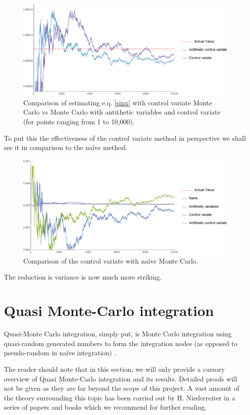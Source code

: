 \documentclass[12pt]{article}
\numberwithin{equation}{section}
\begin{document}
\begin{figure}[!htb]
    \centering
    \includegraphics[width=\textwidth]{Images/controlvariate.png}
    \caption{Comparison of estimating e.q. \ref{sinx} with control variate Monte Carlo vs Monte Carlo with antithetic variables and control variate (for points ranging from 1 to 10,000).}
    \label{fig:controlvariate}
\end{figure}
\FloatBarrier
\par To put this the effectiveness of the control variate method in perspective we shall see it in comparison to the naïve method.

\begin{figure}[!htb]
    \centering
    \includegraphics[width=\textwidth]{Images/controlvsnaiveanti.png}
    \caption{Comparison of the control variate with naïve Monte Carlo.}
    \label{fig:controlvsnaivevariate}
\end{figure}
\par The reduction is variance is now much more striking.

\clearpage
\section{Quasi Monte-Carlo integration}
Quasi-Monte Carlo integration, simply put, is Monte Carlo integration using quasi-random generated numbers to form the integration nodes (as opposed to pseudo-random in naïve integration) \cite{MOROKOFF1995218}.
\par The reader should note that in this section, we will only provide a cursory overview of Quasi Monte-Carlo integration and its results. Detailed proofs will not be given as they are far beyond the scope of this project. A vast amount of the theory surrounding this topic has been carried out by H. Niederreiter in a series of papers \cite{Niederreiter1978QuasiMonteCM, lowdiscrepancyNIEDERREITER198851} and books \cite{kuipers1974uniform} which we recommend for further reading.
\end{document}
